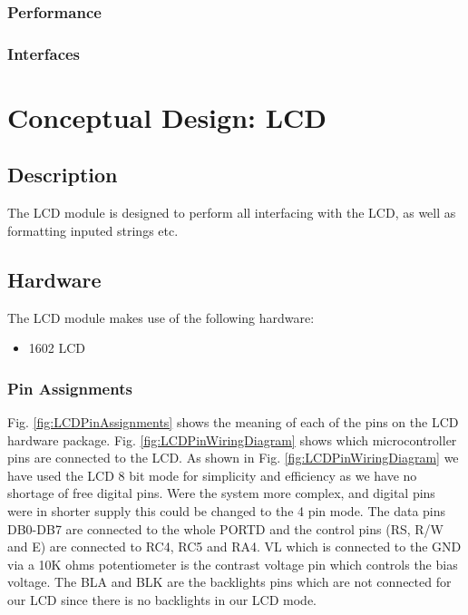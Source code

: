 \documentclass[]{report}
\begin{document}
\subsubsection{Performance}

\subsubsection{Interfaces}

\section{Conceptual Design: LCD}
\subsection{Description}
The LCD module is designed to perform all interfacing with the LCD, as well as formatting inputed strings etc.

\subsection{Hardware}
The LCD module makes use of the following hardware:
\begin{itemize}
	\item 1602 LCD
\end{itemize}

\subsubsection{Pin Assignments}
Fig. \ref{fig:LCDPinAssignments} shows the meaning of each of the pins on the LCD hardware package. Fig. \ref{fig:LCDPinWiringDiagram} shows which microcontroller pins are connected to the LCD. As shown in Fig. \ref{fig:LCDPinWiringDiagram} we have used the LCD 8 bit mode for simplicity and efficiency as we have no shortage of free digital pins. Were the system more complex, and digital pins were in shorter supply this could be changed to the 4 pin mode. \newline
The data pins DB0-DB7 are connected to the whole PORTD and the control pins (RS, R/W and E) are connected to RC4, RC5 and RA4. VL which is connected to the GND via a 10K ohms potentiometer is the contrast voltage pin which controls the bias voltage. The BLA and BLK are the backlights pins which are not connected for our LCD since there is no backlights in our LCD mode.
\end{document}
